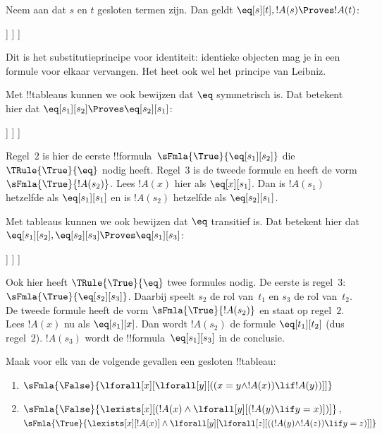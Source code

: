 \documentclass[../../../include/open-logic-section]{subfiles}
\begin{document}
\begin{ex}
Neem aan dat $s$ en $t$ gesloten termen zijn. Dan geldt
$\eq[s][t], !A(s) \Proves !A(t)$:
\begin{oltableau}
  [\sFmla{\False}{\formula{A}(t)}, just = \TAss
    [\sFmla{\True}{\eq[s][t]}, just = \TAss
      [\sFmla{\True}{\formula{A}(s)}, just = \TAss
        [\sFmla{\True}{\formula{A}(t)}, just={\TRule{\True}{\eq}[2, 3]}, close]
      ]
    ]
  ]
\end{oltableau}
Dit is het substitutieprincipe voor identiteit: identieke objecten mag
je in een formule voor elkaar vervangen. Het heet ook wel het principe
van Leibniz.

Met !!{tableau}s kunnen we ook bewijzen dat $\eq$ symmetrisch is. Dat
betekent hier dat $\eq[s_1][s_2] \Proves \eq[s_2][s_1]$:
\begin{oltableau}
  [\sFmla{\False}{\eq[s_2][s_1]}, just = \TAss
    [\sFmla{\True}{\eq[s_1][s_2]}, just = \TAss
      [\sFmla{\True}{\eq[s_1][s_1]}, just = {$\eq$}
        [\sFmla{\True}{\eq[s_2][s_1]}, just = {\TRule{\True}{\eq}[2, 3]}, close]
      ]
    ]
  ]
\end{oltableau}
Regel~$2$ is hier de eerste
!!{formula}~$\sFmla{\True}{\eq[s_1][s_2]}$ die
$\TRule{\True}{\eq}$ nodig heeft. Regel~$3$ is de tweede formule en
heeft de vorm $\sFmla{\True}{!A(s_2)}$. Lees
$!A(x)$ hier als $\eq[x][s_1]$. Dan is $!A(s_1)$ hetzelfde als
$\eq[s_1][s_1]$ en is $!A(s_2)$ hetzelfde als $\eq[s_2][s_1]$.

Met tableaus kunnen we ook bewijzen dat $\eq$ transitief is. Dat
betekent hier dat
$\eq[s_1][s_2], \eq[s_2][s_3] \Proves \eq[s_1][s_3]$:
\begin{oltableau}
  [\sFmla{\False}{\eq[s_1][s_3]}, just = \TAss
    [\sFmla{\True}{\eq[s_1][s_2]}, just = \TAss
      [\sFmla{\True}{\eq[s_2][s_3]}, just = \TAss
        [\sFmla{\True}{\eq[s_1][s_3]}, just = {\TRule{\True}{\eq}[3, 2]}, close]
      ]
    ]
  ]
\end{oltableau}
Ook hier heeft $\TRule{\True}{\eq}$ twee formules nodig. De eerste is
regel~$3$: $\sFmla{\True}{\eq[s_2][s_3]}$. Daarbij speelt $s_2$ de rol
van~$t_1$ en $s_3$ de rol van~$t_2$. De tweede formule heeft de vorm
$\sFmla{\True}{!A(s_2)}$ en staat op regel~$2$. Lees $!A(x)$ nu als
$\eq[s_1][x]$. Dan wordt $!A(s_2)$ de formule
$\eq[t_1][t_2]$ (dus regel~$2$). $!A(s_3)$ wordt de
!!{formula}~$\eq[s_1][s_3]$ in de conclusie.
\end{ex}

\begin{prob}
Maak voor elk van de volgende gevallen een gesloten !!{tableau}:
\begin{enumerate}
\item $\sFmla{\False}{\lforall[x][\lforall[y][((x = y \land !A(x))
      \lif !A(y))]]}$
\item $\sFmla{\False}{\lexists[x][(!A(x) \land
    \lforall[y][(!A(y) \lif y = x)])]}$,\\
  $\sFmla{\True}{\lexists[x][!A(x)] \land
    \lforall[y][\lforall[z][((!A(y) \land !A(z)) \lif y = z)]]}$
\end{enumerate}
\end{prob}
\end{document}
